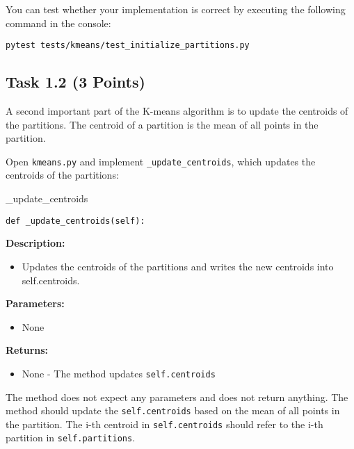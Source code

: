 \documentclass[
english,
smallborders
]{i6prcsht}
\newcommand{\points}[1]{\hfill \color{red}(#1 Points)\color{black}}
\begin{document}
You can test whether your implementation is correct by executing the following command in the console:

\vspace*{0.3cm}

\begin{lstlisting}
pytest tests/kmeans/test_initialize_partitions.py
\end{lstlisting}

\newpage

\subsection*{Task 1.2 \points{3}}

A second important part of the K-means algorithm is to update the centroids of the partitions. The centroid of a partition is the mean of all points in the partition.

Open \texttt{kmeans.py} and implement \texttt{\_update\_centroids}, which updates the centroids of the partitions:

\vspace*{0.3cm}

\begin{functionbox}{\_update\_centroids}
	\begin{lstlisting}[numbers=none]
def _update_centroids(self):
\end{lstlisting}
	
	\textbf{Description:}
	\begin{itemize}[leftmargin=*,topsep=0pt]
		\item Updates the centroids of the partitions and writes the new centroids into self.centroids.
	\end{itemize}
	
	\textbf{Parameters:}
	\begin{itemize}[leftmargin=*,topsep=0pt]
		\item None
	\end{itemize}
	
	\textbf{Returns:}
	\begin{itemize}[leftmargin=*,topsep=0pt]
		\item None - The method updates \texttt{self.centroids}
	\end{itemize}
\end{functionbox}

\vspace*{0.5cm}

The method does not expect any parameters and does not return anything. The method should update the \texttt{self.centroids} based on the mean of all points in the partition. The i-th centroid in \texttt{self.centroids} should refer to the i-th partition in \texttt{self.partitions}.
\end{document}
